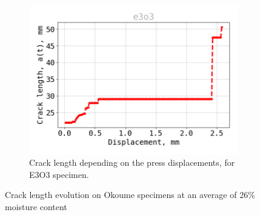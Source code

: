 \begin{figure}[H]
\begin{subfigure}{0.48\linewidth}
	\centering
	\includegraphics[scale=0.3]{Figures/e3o3_a}
	\decoRule
	\caption[Crack length E3O3]{Crack length depending on the press displacements, for E3O3 specimen.}
	\label{fig:E3O3_a}
\end{subfigure}
\caption{Crack length evolution on Okoume specimens at an average of 26\% moisture content}
\label{E3o_a}
\end{figure}
\newpage

